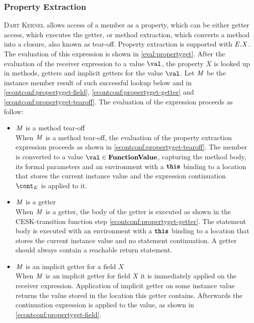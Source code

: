 \documentclass[a4paper,oneside,fleqn]{article}
\newcommand{\kernel}{\textsc{Dart Kernel}}
\newcommand{\synt}[1]{\ensuremath{\text{\textbf{\texttt{#1}}}}}
\newcommand{\this}{\synt{this}}
\newcommand{\dfunval}{\mathbf{FunctionValue}}
\newcommand{\idmeta}{\ensuremath{\mathit{X}}}
\begin{document}
\subsubsection{Property Extraction}
\label{subsubsec:property-extraction}

\kernel{} allows access of a member as a property, which can be either getter access, which executes the getter, or method extraction, which converts a method into a closure, also known as tear-off.
Property extraction is supported with $\PropertyGet{\expr}{\idmeta}$.
The evaluation of this expression is shown in \eqref{eval:propertyget}.
After the evaluation of the receiver expression to a value $\val$, the property $\idmeta$ is looked up in methods, getters and implicit getters for the value $\val$.
Let $\mathit{M}$ be the instance member result of such successful lookup below and in \eqref{econtconf:propertyget-field}, \eqref{econtconf:propertyget-getter} and \eqref{econtconf:propertyget-tearoff}.
The evaluation of the expression proceeds as follow:

\begin{itemize}
    \item $\mathit{M}$ is a method tear-off\\
        When $\mathit{M}$ is a method tear-off, the evaluation of the property extraction expression proceeds as shown in \eqref{econtconf:propertyget-tearoff}.
        The member is converted to a value $\val \in \dfunval$, capturing the method body, its formal parameters and an environment with a $\this$ binding to a location that stores the current instance value and the expression continuation $\econt$ is applied to it.

    \item $\mathit{M}$ is a getter\\
        When $\mathit{M}$ is a getter, the body of the getter is executed as shown in the CESK-transition function step \eqref{econtconf:propertyget-getter}.
        The statement body is executed with an environment with a $\this$ binding to a location that stores the current instance value and no statement continuation.
        A getter should always contain a reachable return statement.

    \item $\mathit{M}$ is an implicit getter for a field $\idmeta$\\
        When $\mathit{M}$ is an implicit getter for field $\idmeta$ it is immediately applied on the receiver expression.
        Application of implicit getter on some instance value returns the value stored in the location this getter contains.
        Afterwards the continuation expression is applied to the value, as shown in \eqref{econtconf:propertyget-field}.

\end{itemize}
\end{document}
